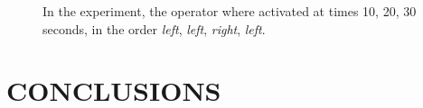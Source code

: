 \documentclass[letterpaper, 10 pt, conference]{ieeeconf}  %
\begin{document}
	\begin{figure}[h!]
		\begin{center}
		\end{center}
		\caption{In the experiment, the operator where activated at times 10, 20, 30 seconds, in the order \textit{left}, \textit{left}, \textit{right}, \textit{left}.}
		\label{fig:sim2-lr}
	\end{figure}

	\section{CONCLUSIONS}
	\label{sec:conclusions}
	
	
	
\end{document}

